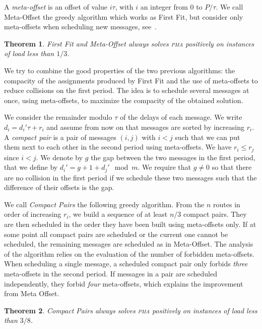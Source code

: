 \documentclass[10pt, conference, letterpaper]{algotel}
\newtheorem{theorem}{Theorem}
\newcommand\pma{\textsc{pma}\xspace}
\begin{document}
A \emph{meta-offset} is an offset of value $i\tau$, with $i$ an integer from $0$ to $P / \tau$. We call Meta-Offset the greedy algorithm which works as First Fit, but consider only meta-offsets when scheduling new messages, see~\cite{barth2018deterministic}.

\begin{theorem}
First Fit and Meta-Offset always solves \pma positively on instances of load less than $1/3$.
\end{theorem}

 We try to combine the good properties of the two previous algorithms: the compacity of the assignments produced by First Fit and the use of meta-offsets to reduce collisions on the first period. The idea is to schedule several messages at once, using meta-offsets, to maximize the compacity of the obtained solution. 

 We consider the remainder modulo $\tau$ of the delays of each message. We write $d_i = d_{i}'\tau + r_i$ and assume from now on that messages are sorted by increasing $r_i$. A \emph{compact pair} is a pair of messages $(i,j)$ with $i < j$ such that we can put them next to each other in the second period using meta-offsets.
We have $r_i \leq r_j$ since $i < j$. We denote by $g$ the gap between the two messages in the first period, that we define by $d_{i}' = g + 1 + d_{j}' \mod m$. We require that $g \neq 0$ so that there are no collision in the first period if we schedule these two messages such that the difference of their offsets is the gap. 


We call \emph{Compact Pairs} the following greedy algorithm. From the $n$ routes in order
of increasing $r_i$, we build a sequence of at least $n/3$ compact pairs. They are then scheduled in the order they have been built using meta-offsets only. If at some point all compact pairs are scheduled or the current one cannot be scheduled, the remaining messages are scheduled as in Meta-Offset. The analysis of the algorithm relies on the evaluation of the number of forbidden meta-offsets. When scheduling a single message, a scheduled compact pair only forbids \emph{three} meta-offsets in the second period. If messages in a pair are scheduled independently, they forbid \emph{four} meta-offsets, which explains the improvement from Meta Offset.

\begin{theorem}
Compact Pairs always solves \pma positively on instances of load less than $3/8$.
\end{theorem}
\end{document}
